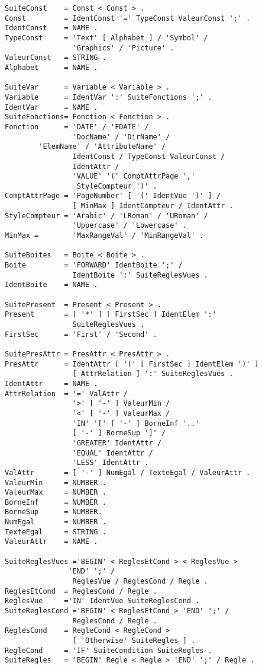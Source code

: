 {\begin{verbatim}
SuiteConst    = Const < Const > .
Const         = IdentConst '=' TypeConst ValeurConst ';' .
IdentConst    = NAME .
TypeConst     = 'Text' [ Alphabet ] / 'Symbol' /
                'Graphics' / 'Picture' .
ValeurConst   = STRING .
Alphabet      = NAME .

SuiteVar      = Variable < Variable > .
Variable      = IdentVar ':' SuiteFonctions ';' .
IdentVar      = NAME .
SuiteFonctions= Fonction < Fonction > .
Fonction      = 'DATE' / 'FDATE' /
                'DocName' / 'DirName' /
		'ElemName' / 'AttributeName' /
                IdentConst / TypeConst ValeurConst /
                IdentAttr /
                'VALUE' '(' ComptAttrPage ','
                 StyleCompteur ')' .
ComptAttrPage = 'PageNumber' [ '(' IdentVue ')' ] /
                [ MinMax ] IdentCompteur / IdentAttr .
StyleCompteur = 'Arabic' / 'LRoman' / 'URoman' /
                'Uppercase' / 'Lowercase' .
MinMax =        'MaxRangeVal' / 'MinRangeVal' .

SuiteBoites   = Boite < Boite > .
Boite         = 'FORWARD' IdentBoite ';' /
                IdentBoite ':' SuiteReglesVues .
IdentBoite    = NAME .

SuitePresent  = Present < Present > .
Present       = [ '*' ] [ FirstSec ] IdentElem ':'
                SuiteReglesVues .
FirstSec      = 'First' / 'Second' .

SuitePresAttr = PresAttr < PresAttr > .
PresAttr      = IdentAttr [ '(' [ FirstSec ] IdentElem ')' ] 
                [ AttrRelation ] ':' SuiteReglesVues .
IdentAttr     = NAME .
AttrRelation  = '=' ValAttr /
                '>' [ '-' ] ValeurMin /
                '<' [ '-' ] ValeurMax /
                'IN' '[' [ '-' ] BorneInf '..' 
                [ '-' ] BorneSup ']' /
                'GREATER' IdentAttr /
                'EQUAL' IdentAttr /
                'LESS' IdentAttr .
ValAttr       = [ '-' ] NumEgal / TexteEgal / ValeurAttr .
ValeurMin     = NUMBER .
ValeurMax     = NUMBER .
BorneInf      = NUMBER .
BorneSup      = NUMBER.
NumEgal       = NUMBER .
TexteEgal     = STRING .
ValeurAttr    = NAME .

SuiteReglesVues ='BEGIN' < ReglesEtCond > < ReglesVue >
               'END' ';' /
                ReglesVue / ReglesCond / Regle .
ReglesEtCond  = ReglesCond / Regle .
ReglesVue     ='IN' IdentVue SuiteReglesCond .
SuiteReglesCond ='BEGIN' < ReglesEtCond > 'END' ';' /
                ReglesCond / Regle .
ReglesCond    = RegleCond < RegleCond >
                [ 'Otherwise' SuiteRegles ] .
RegleCond     = 'IF' SuiteCondition SuiteRegles .
SuiteRegles   = 'BEGIN' Regle < Regle > 'END' ';' / Regle .


\end{verbatim}}
